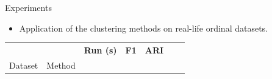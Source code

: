 \documentclass{beamer}
\begin{document}
\begin{frame}{Experiments}

    \begin{itemize}
        \item Application of the clustering methods on real-life ordinal datasets.
    \end{itemize}
    \begin{table}
        \tiny
        \begin{adjustbox}{width=.7\columnwidth}
            \begin{tabular}{lllllll}
                                                            &                      & \textbf{Run (s)}          & \textbf{F1}               & \textbf{ARI}              \\
                Dataset                                     & Method               &                           &                           &                           \\


\end{tabular}
\end{adjustbox}
\end{table}
\end{frame}
\end{document}
